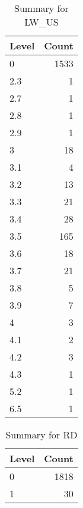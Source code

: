 \begin{table}[ht]
\centering
\begin{tabular}{lr}
  \hline
Level & Count \\ 
  \hline
0 & 1533 \\ 
  2.3 &   1 \\ 
  2.7 &   1 \\ 
  2.8 &   1 \\ 
  2.9 &   1 \\ 
  3 &  18 \\ 
  3.1 &   4 \\ 
  3.2 &  13 \\ 
  3.3 &  21 \\ 
  3.4 &  28 \\ 
  3.5 & 165 \\ 
  3.6 &  18 \\ 
  3.7 &  21 \\ 
  3.8 &   5 \\ 
  3.9 &   7 \\ 
  4 &   3 \\ 
  4.1 &   2 \\ 
  4.2 &   3 \\ 
  4.3 &   1 \\ 
  5.2 &   1 \\ 
  6.5 &   1 \\ 
   \hline
\end{tabular}
\caption{Summary for LW_US} 
\label{tab: LW_US}
\end{table}
\begin{table}[ht]
\centering
\begin{tabular}{lr}
  \hline
Level & Count \\ 
  \hline
0 & 1818 \\ 
  1 &  30 \\ 
   \hline
\end{tabular}
\caption{Summary for RD} 
\label{tab: RD}
\end{table}
